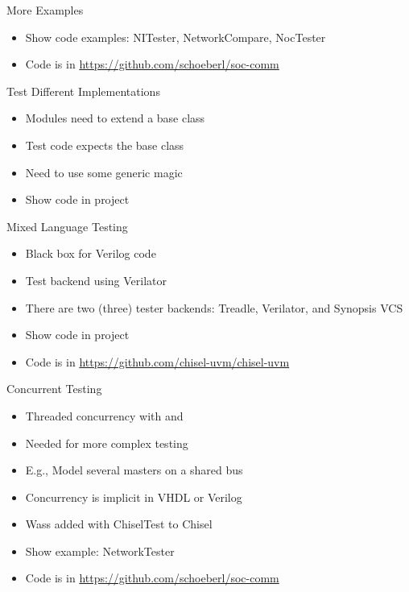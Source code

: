 \begin{frame}[fragile]{More Examples}
\begin{itemize}
\item Show code examples: NITester, NetworkCompare, NocTester
\item Code is in \url{https://github.com/schoeberl/soc-comm}
\end{itemize}
\end{frame}

\begin{frame}[fragile]{Test Different Implementations}
\begin{itemize}
\item Modules need to extend a base class
\item Test code expects the base class
\item Need to use some generic magic
\item Show code in  project
\end{itemize}
\end{frame}

\begin{frame}[fragile]{Mixed Language Testing}
\begin{itemize}
\item Black box for Verilog code
\item Test backend using Verilator
\item There are two (three) tester backends: Treadle, Verilator, and Synopsis VCS
\item Show code in  project
\item Code is in \url{https://github.com/chisel-uvm/chisel-uvm}
\end{itemize}
\end{frame}

\begin{frame}[fragile]{Concurrent Testing}
\begin{itemize}
\item Threaded concurrency with  and 
\item Needed for more complex testing
\item E.g., Model several masters on a shared bus
\item Concurrency is implicit in VHDL or Verilog
\item Wass added with ChiselTest to Chisel
\item Show example: NetworkTester
\item Code is in \url{https://github.com/schoeberl/soc-comm}
\end{itemize}
\end{frame}

